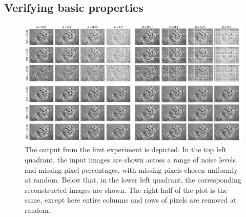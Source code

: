 \begin{algorithm}[t]
\begin{algorithmic}
        \vspace{0.15cm}
        \vspace{0.15cm}
        \vspace{0.15cm}
        \State{$\D \leftarrow  \RR + \delta \D $}
        \vspace{0.15cm}
        \EndWhile
        \vspace{0.25cm}
        \vspace{0.15cm}
    \end{algorithmic}
\end{algorithm}

\subsection{Verifying basic properties}




\begin{figure}[t]
    \hypertarget{butterflies}{}
    \label{fig:butterflies}
    \begin{center}
        \includegraphics[width=0.95\linewidth]{Figures/butterflies.jpg}
    \end{center}
    \caption{\small{The output from the first experiment is depicted. In the top left quadrant, the input images are shown across a range of noise levels and missing pixel percentages, with missing pixels chosen uniformly at random. Below that, in the lower left quadrant, the corresponding reconstructed images are shown. The right half of the plot is the same, except here entire columns and rows of pixels are removed at random.}}
\end{figure}


